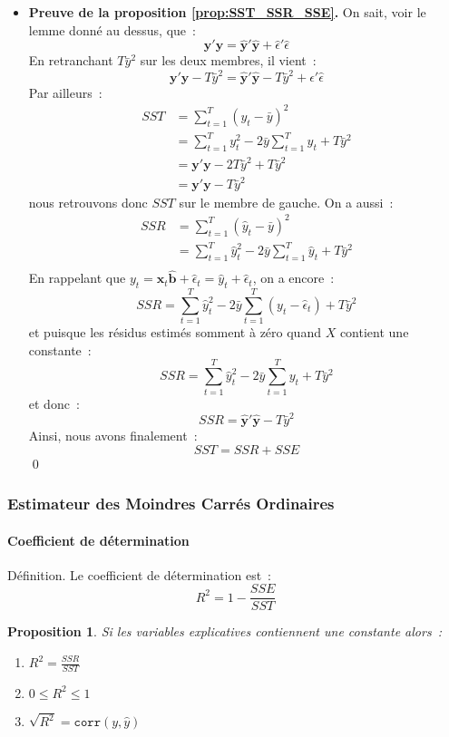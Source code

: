\documentclass[10pt]{beamer}
\theoremstyle{plain}
\newenvironment{defn}[1]
{\bgroup \small\begin{block}{Définition. #1}}
  {\end{block}\egroup}
\newtheorem{prop}{Proposition}
\begin{document}
\begin{notes}
\begin{itemize}
\item \textbf{Preuve de la proposition \ref{prop:SST_SSR_SSE}.} On sait, voir le lemme donné au dessus, que~:
  \[
    \mathbf y'\mathbf y = \hat{\mathbf y}' \hat{\mathbf y} + \hat\epsilon'\hat\epsilon
  \]
  En retranchant $T\bar y^2$ sur les deux membres, il vient~:
  \[
    \mathbf y'\mathbf y - T\bar y^2 = \hat{\mathbf y}' \hat{\mathbf y} - T\bar y^2 + \hat\epsilon'\hat\epsilon
  \]
  Par ailleurs~:
  \[
    \begin{split}
      SST &= \sum_{t=1}^T(y_t-\bar y)^2\\
          &= \sum_{t=1}^Ty_t^2 - 2\bar y\sum_{t=1}^Ty_t + T\bar y^2\\
          &= \mathbf y'\mathbf y - 2T\bar y^2 + T\bar y^2\\
          &= \mathbf y'\mathbf y - T\bar y^2
    \end{split}
  \]
  nous retrouvons donc $SST$ sur le membre de gauche. On a aussi~:
\[
    \begin{split}
      SSR &= \sum_{t=1}^T(\hat y_t-\bar y)^2\\
          &= \sum_{t=1}^T\hat y_t^2 - 2\bar y\sum_{t=1}^T\hat y_t + T\bar y^2\\
    \end{split}
  \]
  En rappelant que  $y_t = \mathbf x_t \hat{\mathbf b} + \hat\epsilon_t = \hat y_t + \hat\epsilon_t$, on a encore~:
  \[
    SSR= \sum_{t=1}^T\hat y_t^2 - 2\bar y\sum_{t=1}^T (y_t-\hat\epsilon_t) + T\bar y^2
  \]
  et puisque les résidus estimés somment à zéro quand $X$ contient une constante~:
  \[
    SSR = \sum_{t=1}^T\hat y_t^2 - 2\bar y\sum_{t=1}^T y_t + T\bar y^2
  \]
  et donc~:
  \[
    SSR = \hat{\mathbf y}'\hat{\mathbf y} - T\bar y^2
  \]
Ainsi, nous avons finalement~:
  \[
    SST = SSR + SSE
  \]
  \qed\newline

  \end{itemize}
\end{notes}


\begin{frame}
  \frametitle{Estimateur des Moindres Carrés Ordinaires}
  \framesubtitle{Coefficient de détermination}

  \begin{defn}{}
    Le coefficient de détermination est~:
    \[
      R^2 = 1 - \frac{SSE}{SST}
    \]
  \end{defn}

  \bigskip

  \begin{prop}\label{prop:r2}
    Si les variables explicatives contiennent une constante alors~:
    \begin{enumerate}
      \item $R^2 = \frac{SSR}{SST}$
      \item $0 \leq R^2 \leq 1$
      \item $\sqrt{R^2} = \mathtt{corr}(y,\hat y)$
    \end{enumerate}
  \end{prop}

\end{frame}
\end{document}
